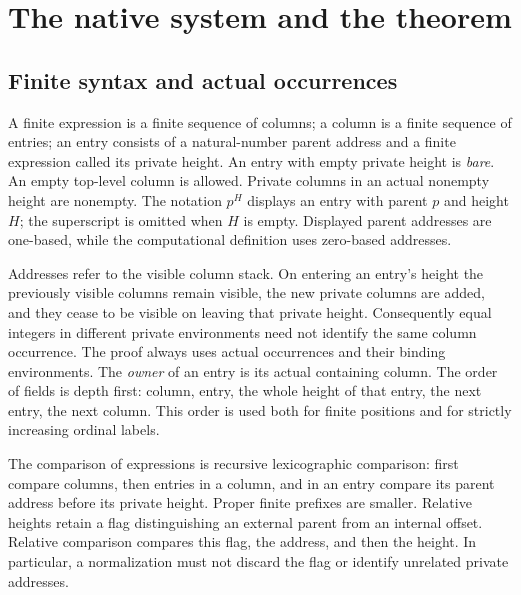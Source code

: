 \section{The native system and the theorem}\label{ch:native}

\subsection{Finite syntax and actual occurrences}
A finite expression is a finite sequence of columns; a column is a finite
sequence of entries; an entry consists of a natural-number parent address
and a finite expression called its private height. An entry with empty
private height is \emph{bare}. An empty top-level column is allowed.
Private columns in an actual nonempty height are nonempty. The notation
$p^H$ displays an entry with parent $p$ and height $H$; the superscript is
omitted when $H$ is empty. Displayed parent addresses are one-based, while
the computational definition uses zero-based addresses.

Addresses refer to the visible column stack. On entering an entry's
height the previously visible columns remain visible, the new private
columns are added, and they cease to be visible on leaving that private
height. Consequently equal integers in different private environments
need not identify the same column occurrence. The proof always uses actual
occurrences and their binding environments. The \emph{owner} of an entry
is its actual containing column. The order of fields is depth first:
column, entry, the whole height of that entry, the next entry, the next
column. This order is used both for finite positions and for strictly
increasing ordinal labels.

The comparison of expressions is recursive lexicographic comparison:
first compare columns, then entries in a column, and in an entry compare
its parent address before its private height. Proper finite prefixes are
smaller. Relative heights retain a flag distinguishing an external parent
from an internal offset. Relative comparison compares this flag, the
address, and then the height. In particular, a normalization must not
discard the flag or identify unrelated private addresses.


